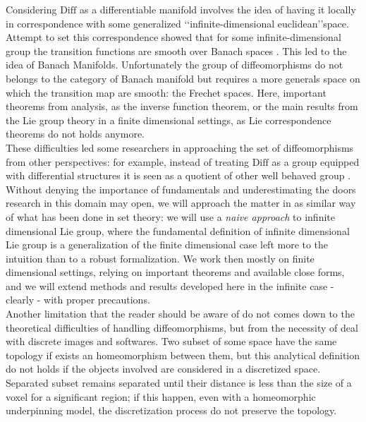 Considering $\text{Diff}$ as a differentiable manifold involves the idea of having it locally in correspondence with some generalized \lq\lq infinite-dimensional euclidean\rq\rq  space. Attempt to set this correspondence showed that for some infinite-dimensional group the transition functions are smooth over Banach spaces \cite{khesin2008geometry}. This led to the idea of Banach Manifolds. Unfortunately the group of diffeomorphisms do not belongs to the category of Banach manifold but requires a more generals space on which the transition map are smooth: the Frechet spaces. Here, important theorems from analysis, as the inverse function theorem, or the main results from the Lie group theory in a finite dimensional settings, as Lie correspondence theorems do not holds anymore.\\
These difficulties led some researchers in approaching the set of diffeomorphisms from other perspectives: 
for example, instead of treating $\text{Diff}$ as a group equipped with differential structures it is seen as a quotient of other well behaved group \cite{wojtynski1994one}.\\
Without denying the importance of fundamentals and underestimating the doors research in this domain may open, we will approach the matter in as similar way of what has been done in set theory: we will use a \emph{naive approach} to infinite dimensional Lie group, where the fundamental definition of infinite dimensional Lie group is a generalization of the finite dimensional case left more to the intuition than to a robust formalization. 
We work then mostly on finite dimensional settings, relying on important theorems and available close forms, and we will extend methods and results developed here in the infinite case -clearly - with proper precautions.\\

Another limitation that the reader should be aware of do not comes down to the theoretical difficulties of handling diffeomorphisms, but from the necessity of deal with discrete images and softwares. Two subset of some space have the same topology if exists an homeomorphism between them, but this analytical definition do not holds if the objects involved are considered in a discretized space. Separated subset remains separated until their distance is less than the size of a voxel for a significant region; if this happen, even with a homeomorphic underpinning model, the discretization process do not preserve the topology.\\

